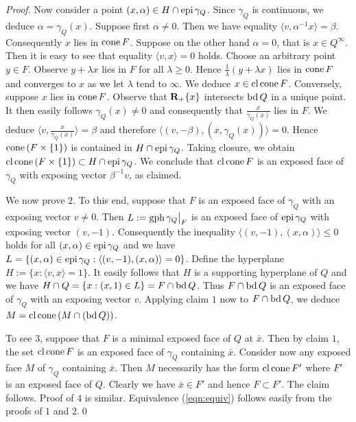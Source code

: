 \documentclass[smallextended,numbook]{svjour3}
\begin{document}
\begin{appendices}
\begin{proof}
Now consider a point $(x,\alpha)\in H\cap {\mbox{\rm epi}\,} \gamma_Q$. Since $\gamma_Q$ is continuous, we deduce $\alpha=\gamma_Q(x)$. Suppose first $\alpha\neq 0$. Then we have equality $\langle v,\alpha^{-1}x \rangle = \beta$. Consequently $x$ lies in  ${\mbox{\rm cone}\,} F$. Suppose on the other hand $\alpha=0$, that is $x\in Q^{\infty}$. Then it is easy to see that equality $\langle v,x \rangle = 0$ holds. Choose an arbitrary point $y\in F$. Observe $y+\lambda x$ lies in $F$ for all $\lambda \geq 0$. Hence $\frac{1}{\lambda}(y+ \lambda x)$ lies in ${\mbox{\rm cone}\,} F$ and converges to $x$ as we let $\lambda$  tend to $\infty$. We deduce $x \in {\mbox{\rm cl}\,} {\mbox{\rm cone}\,} F$.
Conversely, suppose $x$ lies in ${\mbox{\rm cone}\,} F$. Observe that ${{\bf R}}_{+}\{x\}$ intersects ${\mbox{\rm bd}\,} Q$ in a unique point. It then easily follows $\gamma_Q(x)\neq 0$ and consequently that $\frac{x}{\gamma_Q(x)}$ lies in $F$. We deduce $\langle v, \frac{x}{\gamma_Q(x)}\rangle=\beta$  and therefore $\langle (v,-\beta), (x,\gamma_Q(x)) \rangle = 0$. Hence ${\mbox{\rm cone}\,} (F\times \{1\})$ is contained in $H\cap {\mbox{\rm epi}\,} \gamma_Q$. Taking closure, we obtain ${\mbox{\rm cl}\,} {\mbox{\rm cone}\,} (F\times \{1\})\subset H\cap {\mbox{\rm epi}\,} \gamma_Q$. We conclude that ${\mbox{\rm cl}\,}{\mbox{\rm cone}\,} F$ is an exposed face of $\gamma_Q$ with exposing vector $\beta^{-1}v$, as claimed.

We now prove $2$. To this end, suppose that $F$ is an exposed face of $\gamma_Q$ with an exposing vector $v\neq 0$. 
Then $L:={\mbox{\rm gph}\,} \gamma_Q\big|_F$ is an exposed face of ${\mbox{\rm epi}\,} \gamma_Q$
with exposing vector $(v,-1)$. 
Consequently the inequality
$\langle (v, -1), (x,\alpha)\rangle\leq 0$  holds for all $(x,\alpha)\in {\mbox{\rm epi}\,} \gamma_Q$ and we have $L= \{(x,\alpha)\in{\mbox{\rm epi}\,} \gamma_Q :\langle (v, -1), (x,\alpha)\rangle=0\}$. 
Define the hyperplane $H:=\{x: \langle v,x\rangle = 1\}$. It easily follows that $H$ is a supporting hyperplane of $Q$ and we have $H\cap Q = \{x: (x,1)\in L\}= F\cap {\mbox{\rm bd}\,} Q$. Thus $F\cap {\mbox{\rm bd}\,} Q$ is an exposed face of $\gamma_Q$ with an exposing vector $v$. Applying claim $1$ now to $F\cap {\mbox{\rm bd}\,} Q$, we deduce
$M={\mbox{\rm cl}\,}{\mbox{\rm cone}\,} (M\cap ({\mbox{\rm bd}\,} Q))$.

To see 3, suppose that $F$ is a minimal exposed face of $Q$ at $\bar{x}$. Then by claim $1$, the set ${\mbox{\rm cl}\,} {\mbox{\rm cone}\,} F$ is an exposed face of $\gamma_Q$ containing $\bar{x}$. Consider now any exposed face $M$ of $\gamma_Q$ containing $\bar{x}$. Then $M$ necessarily has the form ${\mbox{\rm cl}\,}{\mbox{\rm cone}\,} F'$ where $F'$ is an exposed face of $Q$.
Clearly we have $\bar{x}\in F'$ and hence $F\subset F'$. The claim follows. Proof of $4$ is similar. Equivalence (\ref{eqn:equiv}) follows easily from the proofs of $1$ and $2$.\qed
\end{proof}


\end{appendices}
\end{document}
